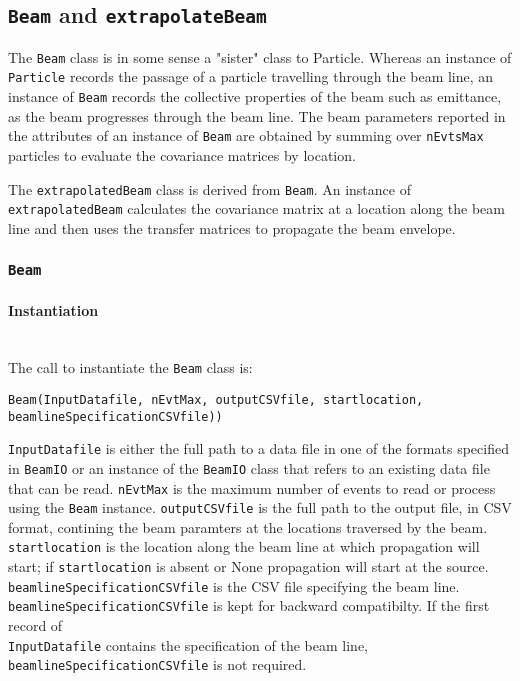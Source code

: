 \vfill
\pagebreak

\subsection{\texttt{Beam} and \texttt{extrapolateBeam}}
\label{SubSect:B}

The \texttt{Beam} class is in some sense a "sister" class to Particle.
Whereas an instance of \texttt{Particle} records the passage of a
particle travelling through the beam line, an instance
of \texttt{Beam} records the collective properties of the beam such as
emittance, as the beam progresses through the beam line.
The beam parameters reported in the attributes of an instance
of \texttt{Beam} are obtained by summing over \texttt{nEvtsMax}
particles to evaluate the covariance matrices by location.

The \texttt{extrapolatedBeam} class is derived from \texttt{Beam}.
An instance of \texttt{extrapolatedBeam} calculates the covariance
matrix at a location along the beam line and then uses the transfer
matrices to propagate the beam envelope.

\subsubsection{\texttt{Beam}}

\paragraph{Instantiation}\mbox{}\\
\noindent
The call to instantiate the \texttt{Beam} class is:
\begin{center}
  \texttt{Beam(InputDatafile, nEvtMax, outputCSVfile,
  startlocation, beamlineSpecificationCSVfile))}
\end{center}
\texttt{InputDatafile} is either the full path to a data file in one
of the formats specified in \texttt{BeamIO} or an instance of
the \texttt{BeamIO} class that refers to an existing data file that
can be read.
\texttt{nEvtMax} is the maximum number of events to read or process
using the \texttt{Beam} instance.
\texttt{outputCSVfile} is the full path to the output file, in CSV
format, contining the beam paramters at the locations traversed by the
beam. 
\texttt{startlocation} is the location along the beam line at which
propagation will start; if \texttt{startlocation} is absent or None
propagation will start at the source.
\texttt{beamlineSpecificationCSVfile} is the CSV file specifying the
beam line. \\
\texttt{beamlineSpecificationCSVfile} is kept for backward
compatibilty.
If the first record of \\
\texttt{InputDatafile} contains the specification of the beam
line, \texttt{beamlineSpecificationCSVfile} is not required. 

